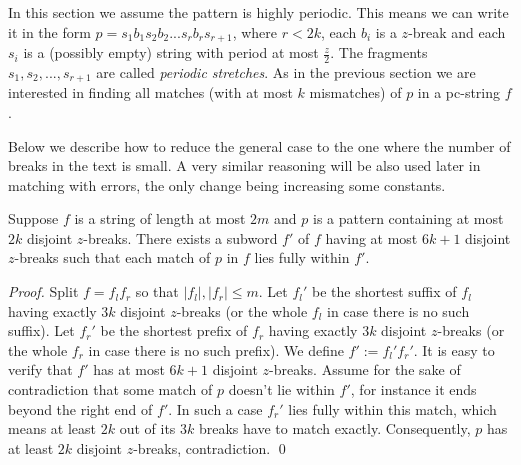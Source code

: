 \documentclass[runningheads]{llncs}
\begin{document}
\label{section:highly}
In this section we assume the pattern is highly periodic. This means we can write it in the form $p=s_1b_1s_2b_2...s_rb_rs_{r+1}$, where $r<2k$, each $b_i$ is a $z$-break and each $s_i$ is a (possibly empty) string with period at most $\frac{z}{2}$. The fragments $s_1,s_2,...,s_{r+1}$ are called {\it periodic stretches}.  As in the previous section we are interested in finding all matches (with at most $k$ mismatches) of $p$ in a pc-string $f$. 

Below we describe how to reduce the general case to the one where the number of breaks in the text is small. A very similar reasoning will be also used later in matching with errors, the only change being increasing some constants.

\begin{lemma}\label{lemma:discarding_breaks}
Suppose $f$ is a string of length at most $2m$ and $p$ is a pattern containing at most $2k$ disjoint $z$-breaks. There exists a subword $f'$ of $f$ having at most $6k+1$ disjoint $z$-breaks such that each match of $p$ in $f$ lies fully within $f'$.
\end{lemma}
\begin{proof}
Split $f=f_lf_r$ so that $|f_l|,|f_r|\leq m$. Let $f_l'$ be the shortest suffix of $f_l$ having exactly $3k$ disjoint $z$-breaks (or the whole $f_l$ in case there is no such suffix). Let $f_r'$ be the shortest prefix of $f_r$ having exactly $3k$ disjoint $z$-breaks (or the whole $f_r$ in case there is no such prefix). We define $f':=f_l'f_r'$. It is easy to verify that $f'$ has at most $6k+1$ disjoint $z$-breaks. Assume for the sake of contradiction that some match of $p$ doesn't lie within $f'$, for instance it ends beyond the right end of $f'$. In such a case $f_r'$ lies fully within this match, which means at least $2k$ out of its $3k$ breaks have to match exactly. Consequently, $p$ has at least $2k$ disjoint $z$-breaks, contradiction.
\qed
\end{proof}
\end{document}

